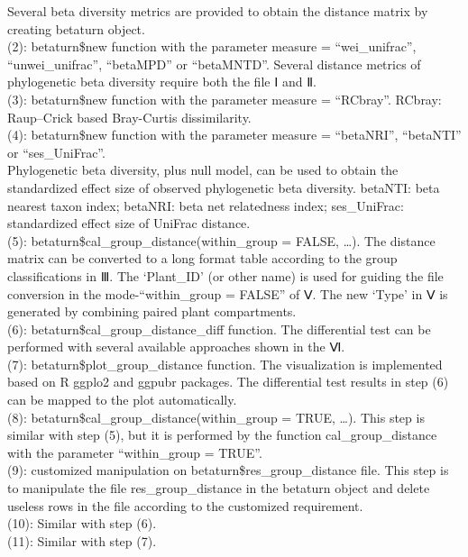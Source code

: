 \documentclass[
]{book}
\newenvironment{Shaded}{\begin{snugshade}}{\end{snugshade}}
\newcommand{\AttributeTok}[1]{\textcolor[rgb]{0.13,0.29,0.53}{#1}}
\newcommand{\CommentTok}[1]{\textcolor[rgb]{0.56,0.35,0.01}{\textit{#1}}}
\newcommand{\FunctionTok}[1]{\textcolor[rgb]{0.13,0.29,0.53}{\textbf{#1}}}
\newcommand{\NormalTok}[1]{#1}
\newcommand{\OtherTok}[1]{\textcolor[rgb]{0.56,0.35,0.01}{#1}}
\newcommand{\SpecialCharTok}[1]{\textcolor[rgb]{0.81,0.36,0.00}{\textbf{#1}}}
\newcommand{\StringTok}[1]{\textcolor[rgb]{0.31,0.60,0.02}{#1}}
\begin{document}
Several beta diversity metrics are provided to obtain the distance matrix by creating betaturn object.\\
(2): betaturn\$new function with the parameter measure = ``wei\_unifrac'', ``unwei\_unifrac'', ``betaMPD'' or ``betaMNTD''.
Several distance metrics of phylogenetic beta diversity require both the file Ⅰ and Ⅱ.\\
(3): betaturn\$new function with the parameter measure = ``RCbray''. RCbray: Raup--Crick based Bray-Curtis dissimilarity.\\
(4): betaturn\$new function with the parameter measure = ``betaNRI'', ``betaNTI'' or ``ses\_UniFrac''.\\
Phylogenetic beta diversity, plus null model, can be used to obtain the standardized effect size of observed phylogenetic beta diversity.
betaNTI: beta nearest taxon index; betaNRI: beta net relatedness index; ses\_UniFrac: standardized effect size of UniFrac distance.\\
(5): betaturn\$cal\_group\_distance(within\_group = FALSE, \ldots).
The distance matrix can be converted to a long format table according to the group classifications in Ⅲ.
The `Plant\_ID' (or other name) is used for guiding the file conversion in the mode-``within\_group = FALSE'' of Ⅴ.
The new `Type' in Ⅴ is generated by combining paired plant compartments.\\
(6): betaturn\$cal\_group\_distance\_diff function.
The differential test can be performed with several available approaches shown in the Ⅵ.\\
(7): betaturn\$plot\_group\_distance function.
The visualization is implemented based on R ggplo2 and ggpubr packages.
The differential test results in step (6) can be mapped to the plot automatically.\\
(8): betaturn\$cal\_group\_distance(within\_group = TRUE, \ldots).
This step is similar with step (5), but it is performed by the function cal\_group\_distance with the parameter ``within\_group = TRUE''.\\
(9): customized manipulation on betaturn\$res\_group\_distance file.
This step is to manipulate the file res\_group\_distance in the betaturn object and delete useless rows in the file according to the customized requirement.\\
(10): Similar with step (6).\\
(11): Similar with step (7).

\begin{Shaded}
\end{Shaded}
\end{document}
